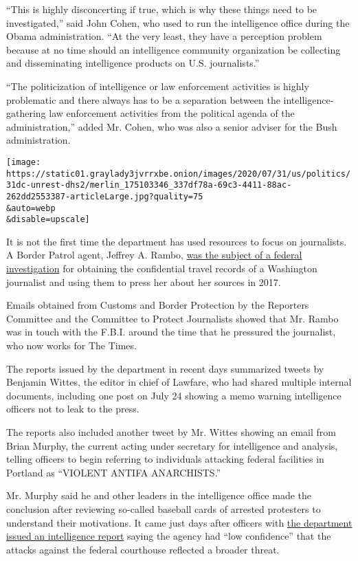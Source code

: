 ``This is highly disconcerting if true, which is why these things need
to be investigated,'' said John Cohen, who used to run the intelligence
office during the Obama administration. ``At the very least, they have a
perception problem because at no time should an intelligence community
organization be collecting and disseminating intelligence products on
U.S. journalists.''

``The politicization of intelligence or law enforcement activities is
highly problematic and there always has to be a separation between the
intelligence-gathering law enforcement activities from the political
agenda of the administration,'' added Mr. Cohen, who was also a senior
adviser for the Bush administration.

\texttt{[image: https://static01.graylady3jvrrxbe.onion/images/2020/07/31/us/politics/31dc-unrest-dhs2/merlin\_175103346\_337df78a-69c3-4411-88ac-262dd2553387-articleLarge.jpg?quality=75\\\&auto=webp\\\&disable=upscale]}

It is not the first time the department has used resources to focus on
journalists. A Border Patrol agent, Jeffrey A. Rambo,
\href{https://www.nytimes3xbfgragh.onion/2018/07/12/business/jeffrey-rambo-james-wolfe-leaks.html}{was
the subject of a federal investigation} for obtaining the confidential
travel records of a Washington journalist and using them to press her
about her sources in 2017.

Emails obtained from Customs and Border Protection by the Reporters
Committee and the Committee to Protect Journalists showed that Mr. Rambo
was in touch with the F.B.I. around the time that he pressured the
journalist, who now works for The Times.

The reports issued by the department in recent days summarized tweets by
Benjamin Wittes, the editor in chief of Lawfare, who had shared multiple
internal documents, including one post on July 24 showing a memo warning
intelligence officers not to leak to the press.

The reports also included another tweet by Mr. Wittes showing an email
from Brian Murphy, the current acting under secretary for intelligence
and analysis, telling officers to begin referring to individuals
attacking federal facilities in Portland as ``VIOLENT ANTIFA
ANARCHISTS.''

Mr. Murphy said he and other leaders in the intelligence office made the
conclusion after reviewing so-called baseball cards of arrested
protesters to understand their motivations. It came just days after
officers with
\href{https://int.graylady3jvrrxbe.onion/data/documenttools/portland-intelligence-assessment/65e0a41de45b7abc/full.pdf}{the
department issued an intelligence report} saying the agency had ``low
confidence'' that the attacks against the federal courthouse reflected a
broader threat.

